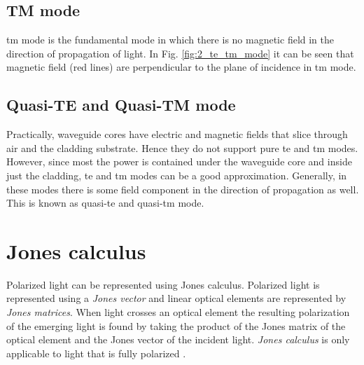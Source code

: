 \documentclass[../report.tex]{subfiles}
\begin{document}
			\subsection{TM mode}
\gls{tm} mode is the fundamental mode in which there is no magnetic field in the direction of propagation of light. In Fig. \ref{fig:2_te_tm_mode} it can be seen that magnetic field (red lines) are perpendicular to the plane of incidence in \gls{tm} mode.
 
			\subsection{Quasi-TE and Quasi-TM mode}				
Practically, waveguide cores have electric and magnetic fields that slice through air and the cladding substrate. Hence they do not support pure \gls{te} and \gls{tm} modes. However, since most the power is contained under the waveguide core and inside just the cladding, \gls{te} and \gls{tm} modes can be a good approximation. Generally, in these modes there is some field component in the direction of propagation as well. This is known as quasi-\gls{te} and quasi-\gls{tm} mode.
	
		\section{Jones calculus}
Polarized light can be represented using Jones calculus. Polarized light is represented using a \textit{Jones vector} and linear optical elements are represented by \textit{Jones matrices}.	When light crosses an optical element the resulting polarization of the emerging light is found by taking the product of the Jones matrix of the optical element and the Jones vector of the incident light. \textit{Jones calculus} is only applicable to light that is fully polarized \cite{burch_introduction_1975}.
		
\end{document}
